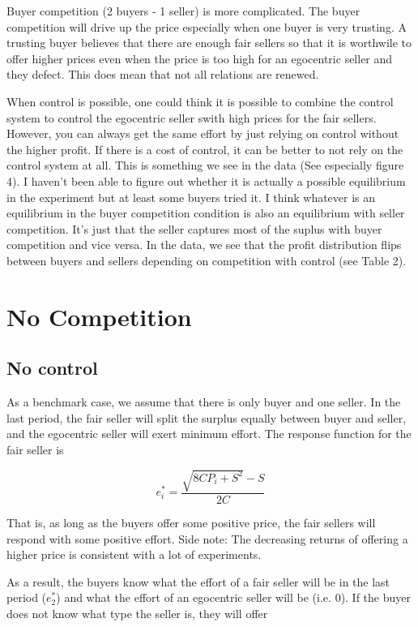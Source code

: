 \documentclass{article}
\begin{document}
Buyer competition (2 buyers - 1 seller) is more complicated. The buyer competition will drive up the price especially when one buyer is very trusting. A trusting buyer believes that there are enough fair sellers so that it is worthwile to offer higher prices even when the price is too high for an egocentric seller and they defect. This does mean that not all relations are renewed.

When control is possible, one could think it is possible to combine the control system to control the egocentric seller swith high prices for the fair sellers. However, you can always get the same effort by just relying on control without the higher profit. If there is a cost of control, it can be better to not rely on the control system at all. This is something we see in the data (See especially figure 4). I haven't been able to figure out whether it is actually a possible equilibrium in the experiment but at least some buyers tried it. I think whatever is an equilibrium in the buyer competition condition is also an equilibrium with seller competition. It's just that the seller captures most of the suplus with buyer competition and vice versa. In the data, we see that the profit distribution flips between buyers and sellers depending on competition with control (see Table 2). 

\section{No Competition}

\subsection{No control}

As a benchmark case, we assume that there is only buyer and one seller. In the last period, the fair seller will split the surplus equally between buyer and seller, and the egocentric seller will exert minimum effort. The response function for the fair seller is 

$$
e^*_i = \frac{\sqrt{8CP_i + S^2} - S}{2C}
$$

That is, as long as the buyers offer some positive price, the fair sellers will respond with some positive effort. Side note: The decreasing returns of offering a higher price is consistent with a lot of experiments.

As a result, the buyers know what the effort of a fair seller will be in the last period ($e^*_2$) and what the effort of an egocentric seller will be (i.e. $0$). If the buyer does not know what type the seller is, they will offer 
\end{document}
